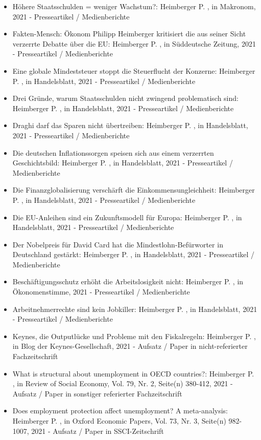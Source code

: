 \begin{itemize}
	 \item Höhere Staatsschulden = weniger Wachstum?: Heimberger P. , in Makronom, 2021 - Presseartikel / Medienberichte
	 \item Fakten-Mensch: Ökonom Philipp Heimberger kritisiert die aus seiner Sicht verzerrte Debatte über die EU: Heimberger P. , in Süddeutsche Zeitung, 2021 - Presseartikel / Medienberichte
	 \item Eine globale Mindeststeuer stoppt die Steuerflucht der Konzerne: Heimberger P. , in Handelsblatt, 2021 - Presseartikel / Medienberichte
	 \item Drei Gründe, warum Staatsschulden nicht zwingend problematisch sind: Heimberger P. , in Handelsblatt, 2021 - Presseartikel / Medienberichte
	 \item Draghi darf das Sparen nicht übertreiben: Heimberger P. , in Handelsblatt, 2021 - Presseartikel / Medienberichte
	 \item Die deutschen Inflationssorgen speisen sich aus einem verzerrten Geschichtsbild: Heimberger P. , in Handelsblatt, 2021 - Presseartikel / Medienberichte
	 \item Die Finanzglobalisierung verschärft die Einkommensungleichheit: Heimberger P. , in Handelsblatt, 2021 - Presseartikel / Medienberichte
	 \item Die EU-Anleihen sind ein Zukunftsmodell für Europa: Heimberger P. , in Handelsblatt, 2021 - Presseartikel / Medienberichte
	 \item Der Nobelpreis für David Card hat die Mindestlohn-Befürworter in Deutschland gestärkt: Heimberger P. , in Handelsblatt, 2021 - Presseartikel / Medienberichte
	 \item Beschäftigungsschutz erhöht die Arbeitslosigkeit nicht: Heimberger P. , in Ökonomenstimme, 2021 - Presseartikel / Medienberichte
	 \item Arbeitnehmerrechte sind kein Jobkiller: Heimberger P. , in Handelsblatt, 2021 - Presseartikel / Medienberichte
	 \item Keynes, die Outputlücke und Probleme mit den Fiskalregeln: Heimberger P. , in Blog der Keynes-Gesellschaft, 2021 - Aufsatz / Paper in nicht-referierter Fachzeitschrift
	 \item What is structural about unemployment in OECD countries?: Heimberger P. , in Review of Social Economy, Vol. 79, Nr. 2, Seite(n) 380-412, 2021 - Aufsatz / Paper in sonstiger referierter Fachzeitschrift
	 \item Does employment protection affect unemployment? A meta-analysis: Heimberger P. , in Oxford Economic Papers, Vol. 73, Nr. 3, Seite(n) 982-1007, 2021 - Aufsatz / Paper in SSCI-Zeitschrift

\end{itemize}
